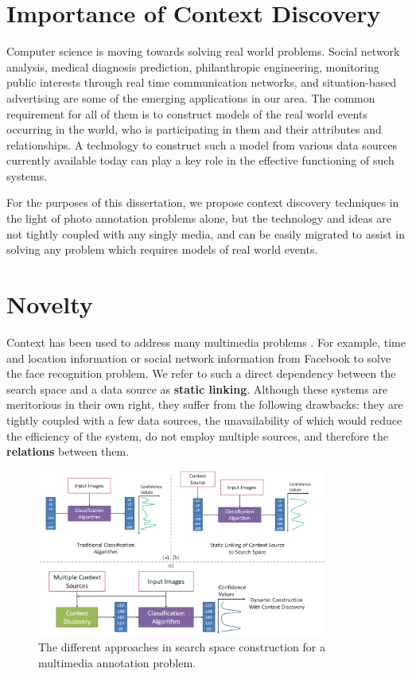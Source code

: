 \section{Importance of Context Discovery}

Computer science is moving towards solving real world problems. Social network analysis, medical diagnosis prediction, philanthropic engineering, monitoring public interests through real time communication networks, and situation-based advertising are some of the emerging applications in our area. The common requirement for all of them is to construct models of the real world events occurring in the world, who is participating in them and their attributes and relationships. A technology to construct such a model from various data sources currently available today can play a key role in the effective functioning of such systems.

For the purposes of this dissertation, we propose context discovery techniques in the light of photo annotation problems alone, but the technology and ideas are not tightly coupled with any singly media, and can be easily migrated to assist in solving any problem which requires models of real world events.

\section{Novelty}

Context has been used to address many multimedia problems \cite{henter2012tag, li2012fusing, naaman2005identity, o2009context,stone2008autotagging}. For example, time and location information or social network information from Facebook to solve the face recognition problem. We refer to such a direct dependency between the search space and a data source as \textbf{static linking}. Although these systems are meritorious in their own right, they suffer from the following drawbacks: they are tightly coupled with a few data sources, the unavailability of which would reduce the efficiency of the system, do not employ multiple sources, and therefore the \textbf{relations} between them. 

\begin{figure}[t]
\centering
\includegraphics[width=0.85\textwidth]{media/with-without-cuenet-2.png}
\caption{The different approaches in search space construction for a multimedia annotation problem.}
\label{fig:with-without-cuenet}
\end{figure}

